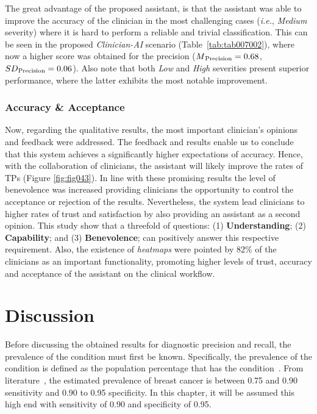 

The great advantage of the proposed assistant, is that the assistant was able to improve the accuracy of the clinician in the most challenging cases ({\it i.e.}, {\it Medium} severity) where it is hard to perform a reliable and trivial classification.
This can be seen in the proposed {\it Clinician-AI} scenario (Table~\ref{tab:tab007002}), where now a higher score was obtained for the precision ($M\textsubscript{Precision} = 0.68$, $SD\textsubscript{Precision} = 0.06$).
Also note that both {\it Low} and {\it High} severities present superior performance, where the latter exhibits the most notable improvement.

\subsubsection{Accuracy \& Acceptance}
\label{sec:app002006004002}

Now, regarding the qualitative results, the most important clinician's opinions and feedback were addressed.
The feedback and results enable us to conclude that this system achieves a significantly higher expectations of accuracy.
Hence, with the collaboration of clinicians, the assistant will likely improve the rates of \acp{TP} (Figure \ref{fig:fig043}).
In line with these promising results the level of benevolence was increased providing clinicians the opportunity to control the acceptance or rejection of the results.
Nevertheless, the system lead clinicians to higher rates of trust and satisfaction by also providing an assistant as a second opinion.
This study show that a threefold of questions: (1) {\bf Understanding}; (2) {\bf Capability}; and (3) {\bf Benevolence}; can positively answer this respective requirement.
Also, the existence of {\it heatmaps} were pointed by 82\% of the clinicians as an important functionality, promoting higher levels of trust, accuracy and acceptance of the assistant on the clinical workflow.

\section{Discussion}
\label{sec:app002007}

Before discussing the obtained results for diagnostic precision and recall, the prevalence of the condition must first be known.
Specifically, the prevalence of the condition is defined as the population percentage that has the condition~\cite{chkotua2017peer}.
From literature~\cite{doi:10.1002/ijc.27711}, the estimated prevalence of breast cancer is between 0.75 and 0.90 sensitivity and 0.90 to 0.95 specificity.
In this chapter, it will be assumed this high end with sensitivity of 0.90 and specificity of 0.95.

